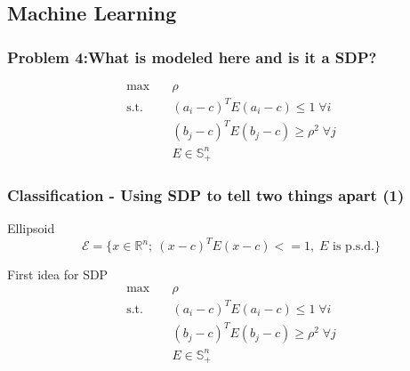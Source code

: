 \documentclass[11pt]{beamer}
\begin{document}
\subsection{Machine Learning}
\begin{frame}
	\frametitle{Problem 4:\newline What is modeled here and is it a SDP?}
	\begin{block}{\vspace*{-3ex}}
		\begin{equation*}
		\begin{aligned}
		\max\quad& \rho\\
		\text{s.t.}\quad&(a_i-c)^TE(a_i-c)\leq 1\;\forall i\\
		&(b_j-c)^TE(b_j-c)\geq \rho^2\;\forall j\\
		& E\in\mathbb{S}^n_+
		\end{aligned}
		\end{equation*}
	\end{block}
\end{frame}
\begin{frame}
	\frametitle{Classification - Using SDP to tell two things apart (1)}
	\begin{block}{Ellipsoid}
		\begin{equation*}
			\mathcal{E}=\{x\in\mathbb{R}^n;\:(x-c)^TE(x-c)<=1,\;E \text{ is p.s.d.}\}
		\end{equation*}
	\end{block}
	\begin{block}{First idea for SDP}
		\begin{equation*}
		\begin{aligned}
		\max\quad& \rho\\
		\text{s.t.}\quad&(a_i-c)^TE(a_i-c)\leq 1\;\forall i\\
		&(b_j-c)^TE(b_j-c)\geq \rho^2\;\forall j\\
		& E\in\mathbb{S}^n_+
		\end{aligned}
		\end{equation*}
	\end{block}
\end{frame}
\end{document}
